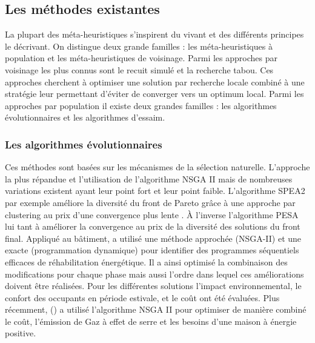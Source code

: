 \subsection{Les méthodes existantes} %
\label{sub:les_methodes_existantes}
La plupart des méta-heuristiques s’inspirent du vivant et des différents principes
le décrivant. On distingue deux grande familles : les méta-heuristiques à population
et les méta-heuristiques de voisinage. Parmi les approches par voisinage les plus
connus sont le recuit simulé et la recherche tabou. Ces approches cherchent à optimiser
une solution par recherche locale combiné à une stratégie leur permettant d’éviter
de converger vers un optimum local. Parmi les approches par population il existe
deux grandes familles : les algorithmes évolutionnaires et les algorithmes d’essaim.


\subsubsection{Les algorithmes évolutionnaires} %
\label{ssub:les_algorithmes_evolutionnaires}
Ces méthodes sont basées sur les mécanismes de la sélection naturelle. L’approche la plus
répandue et l’utilisation de l’algorithme NSGA II \parencite{Deb2002182} mais de nombreuses
variations existent ayant leur point fort et leur point faible. L’algorithme
SPEA2 par exemple améliore la diversité du front de Pareto grâce à une approche par
clustering au prix d’une convergence plus lente \parencite{Zitzler2001}. À l’inverse
l’algorithme PESA lui tant à améliorer la convergence au prix de la diversité des
solutions du front final. Appliqué au bâtiment, \cite{Rivallain2013}
a utilisé une méthode approchée (NSGA-II) et une exacte (programmation dynamique)
pour identifier des programmes séquentiels efficaces de réhabilitation énergétique.
Il a ainsi optimisé la combinaison des modifications pour chaque phase mais aussi l’ordre
dans lequel ces améliorations doivent être réalisées.
Pour les différentes solutions l’impact environnemental, le confort des occupants en
période estivale, et le coût ont été évaluées.
Plus récemment, () a utilisé l’algorithme NSGA II pour
optimiser de manière combiné le coût, l’émission de Gaz à effet de serre et
les besoins d’une maison à énergie positive.


